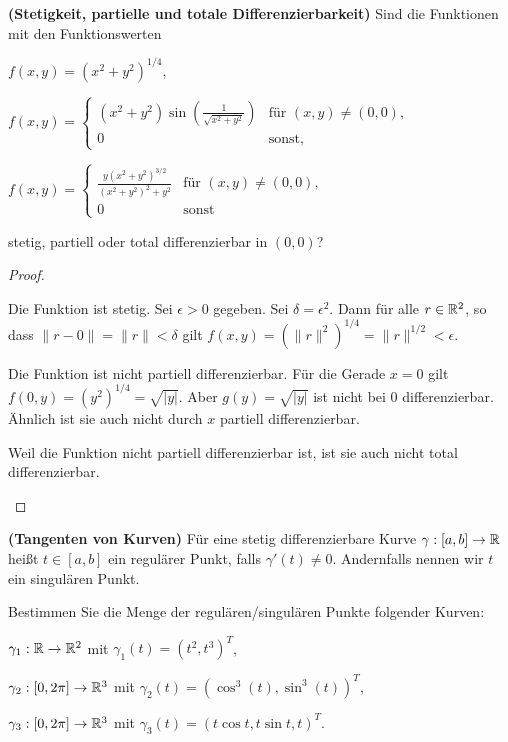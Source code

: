 \begin{Problem}
	\textbf{(Stetigkeit, partielle und totale Differenzierbarkeit)}	Sind die Funktionen mit den Funktionswerten
	\begin{parts}
		\item $f(x,y)=(x^2+y^2)^{1 / 4}$,
		\item $f(x,y)=\begin{cases}
				(x^2+y^2)\sin\left( \frac{1}{\sqrt{x^2+y^2} } \right) & \text{f\"{u}r }(x,y)\neq (0,0),\\
				0 & \text{sonst,}
		\end{cases}$ 
	\item $f(x,y)=\begin{cases}
			\frac{y(x^2+y^2)^{3 / 2}}{(x^2+y^2)^2+y^2} & \text{f\"{u}r }(x,y)\neq (0,0),\\
			0 & \text{sonst}
	\end{cases}$
	\end{parts}
	stetig, partiell oder total differenzierbar in $(0,0)$?
\end{Problem}
\begin{proof}
	\begin{parts}
	\item Die Funktion ist stetig. Sei $\epsilon>0$ gegeben. Sei $\delta=\epsilon^2$. Dann f\"{u}r alle $r\in \mathbb{R}^2$, so dass $\|r-0\|=\|r\|<\delta$ gilt $f(x,y)=(\|r\|^2)^{1 / 4}=\|r\|^{1 / 2}<\epsilon$.

		Die Funktion ist nicht partiell differenzierbar. F\"{u}r die Gerade $x=0$ gilt $f(0,y)=(y^2)^{1 / 4}=\sqrt{|y|} $. Aber $g(y)=\sqrt{|y|} $ ist nicht bei $0$ differenzierbar. Ähnlich ist sie auch nicht durch $x$ partiell differenzierbar.

		Weil die Funktion nicht partiell differenzierbar ist, ist sie auch nicht total differenzierbar.
	\end{parts}
\end{proof}
\begin{Problem}
	\textbf{(Tangenten von Kurven)} Für eine stetig differenzierbare Kurve $\gamma:[a,b]\to \mathbb{R}$ heißt $t\in [a,b]$ ein regulärer Punkt, falls $\gamma'(t)\neq 0$. Andernfalls nennen wir $t$ ein singulären Punkt.

Bestimmen Sie die Menge der regulären/singulären Punkte folgender Kurven:	
\begin{parts}
\item $\gamma_1:\mathbb{R}\to \mathbb{R}^2$ mit $\gamma_1(t)=(t^2,t^3)^T$,
\item $\gamma_2:[0,2\pi]\to \mathbb{R}^3$ mit $\gamma_2(t)=(\cos^3(t),\sin^3(t))^T$,
\item $\gamma_3:[0,2\pi]\to \mathbb{R}^3$ mit $\gamma_3(t)=(t\cos t,t\sin t, t)^T$.
\end{parts}
\end{Problem}

